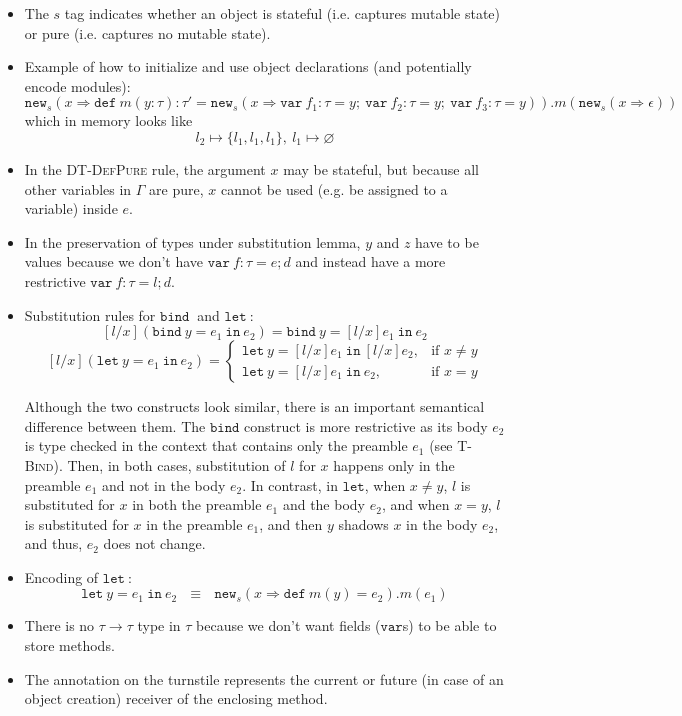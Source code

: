 \documentclass{llncs}
\newcommand{\keywadj}[1]{\mathtt{#1}}
\newcommand{\keyw}[1]{\keywadj{#1}~}
\begin{document}
\begin{itemize}
\item The $s$ tag indicates whether an object is stateful (i.e. captures mutable state) or pure (i.e. captures no mutable state).
\item Example of how to initialize and use object declarations (and potentially encode modules):
\[
\keywadj{new}_{s}(x \Rightarrow \keyw{def} m(y : \tau) : \tau' = \keywadj{new}_{s}(x \Rightarrow \keyw{var} f_1 : \tau = y;~\keyw{var} f_2 : \tau = y;~\keyw{var} f_3 : \tau = y)).m(\keywadj{new}_{s} (x \Rightarrow \epsilon))
\]
which in memory looks like 
\[
l_2 \mapsto \{l_1,l_1,l_1\},~l_1 \mapsto \varnothing
\]
\item In the \textsc{DT-DefPure} rule, the argument $x$ may be stateful, but because all other variables in $\Gamma$ are pure, $x$ cannot be used (e.g. be assigned to a variable) inside $e$.
\item In the preservation of types under substitution lemma, $y$ and $z$ have to be values because we don't have $\keyw{var} f:\tau = e; d$ and instead have a more restrictive $\keyw{var} f:\tau = l;d$.
\item Substitution rules for $\keyw{bind}$ and $\keyw{let}$:
\[
    [l/x](\keyw{bind} y = e_1~\keyw{in} e_2) = \keyw{bind} y = [l/x]e_1~\keyw{in} e_2
\]
\[
    [l/x](\keyw{let} y = e_1~\keyw{in} e_2) = 
\begin{cases}
    \keyw{let} y = [l/x]e_1~\keyw{in} [l/x]e_2, & \text{if } x \not= y\\
    \keyw{let} y = [l/x]e_1~\keyw{in} e_2, & \text{if } x = y
\end{cases}
\]

Although the two constructs look similar, there is an important semantical difference between them. The $\keywadj{bind}$ construct is more restrictive as its body $e_2$ is type checked in the context that contains only the preamble $e_1$ (see \textsc{T-Bind}). Then, in both cases, substitution of $l$ for $x$ happens only in the preamble $e_1$ and not in the body $e_2$. In contrast, in $\keywadj{let}$, when $x \not= y$, $l$ is substituted for $x$ in both the preamble $e_1$ and the body $e_2$, and when $x = y$, $l$ is substituted for $x$ in the preamble $e_1$, and then $y$ shadows $x$ in the body $e_2$, and thus, $e_2$ does not change. 

\item Encoding of $\keyw{let}$:
\[
\keyw{let} y = e_1~\keyw{in} e_2~~~\equiv~~~\keywadj{new}_s(x \Rightarrow \keyw{def} m(y) = e_2).m(e_1)
\]

\item There is no $\tau \rightarrow \tau$ type in $\tau$ because we don't want fields ($\keywadj{var}$s) to be able to store methods.
\item The annotation on the turnstile represents the current or future (in case of an object creation) receiver of the enclosing method.

\end{itemize}
\end{document}
